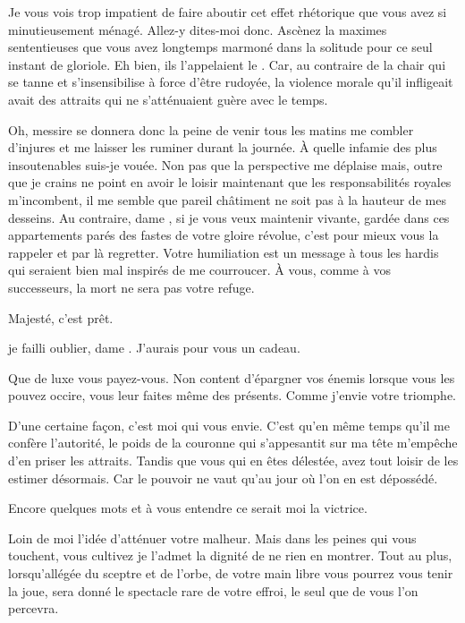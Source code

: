 \begin{drama}
  \reinespeaks Je vous vois trop impatient de faire aboutir cet effet rhétorique que vous avez si minutieusement ménagé. Allez-y dites-moi donc. Ascènez la maximes sententieuses que vous avez longtemps marmoné dans la solitude pour ce seul instant de gloriole.
  \elenaspeaks Eh bien, ils l’appelaient le . Car, au contraire de la chair qui se tanne et s’insensibilise à force d’être rudoyée, la violence morale qu’il infligeait avait des attraits qui ne s’atténuaient guère avec le temps.

  \reinespeaks Oh, messire se donnera donc la peine de venir tous les matins me combler d’injures et me laisser les ruminer durant la journée. À quelle infamie des plus insoutenables suis-je vouée.
  \elenaspeaks {} Non pas que la perspective me déplaise mais, outre que je crains ne point en avoir le loisir maintenant que les responsabilités royales m’incombent, il me semble que pareil châtiment ne soit pas à la hauteur de mes desseins. Au contraire, dame \reine, si je vous veux maintenir vivante, gardée dans ces appartements parés des fastes de votre gloire révolue, c’est pour mieux vous la rappeler et par là regretter. Votre humiliation est un message à tous les hardis qui seraient bien mal inspirés de me courroucer. À vous, comme à vos successeurs, la mort ne sera pas votre refuge.

  \intrat{\disciple}

  \disciplespeaks Majesté, c’est prêt.

  \elenaspeaks je failli oublier, dame \reine. J’aurais pour vous un cadeau.

  \reinespeaks Que de luxe vous payez-vous. Non content d’épargner vos énemis lorsque vous les pouvez occire, vous leur faites même des présents. Comme j’envie votre triomphe.

  \elenaspeaks D’une certaine façon, c’est moi qui vous envie. C’est qu’en même temps qu’il me confère l’autorité, le poids de la couronne qui s’appesantit sur ma tête m’empêche d’en priser les attraits. Tandis que vous qui en êtes délestée, avez tout loisir de les estimer désormais. Car le pouvoir ne vaut qu’au jour où l’on en est dépossédé.

  \reinespeaks Encore quelques mots et à vous entendre ce serait moi la victrice.

  \elenaspeaks Loin de moi l’idée d’atténuer votre malheur. Mais dans les peines qui vous touchent, vous cultivez je l’admet la dignité de ne rien en montrer. Tout au plus, lorsqu’allégée du sceptre et de l’orbe, de votre main libre vous pourrez vous tenir la joue, sera donné le spectacle rare de votre effroi, le seul que de vous l’on percevra.


\end{drama}
